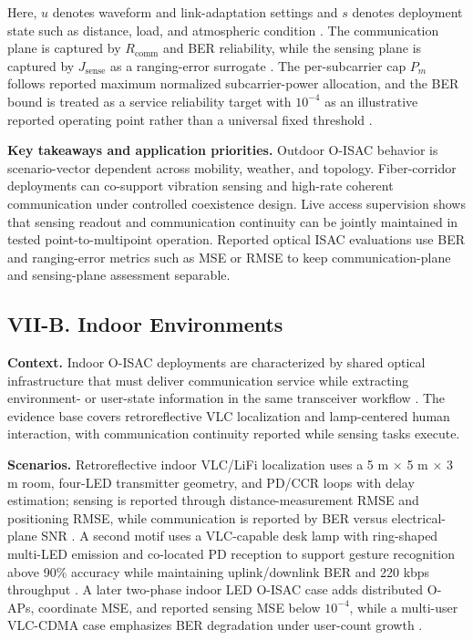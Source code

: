 Here, $u$ denotes waveform and link-adaptation settings and $s$ denotes deployment state such as distance, load, and atmospheric condition \cite{O_ISAC_034,O_ISAC_048}. The communication plane is captured by $R_{\mathrm{comm}}$ and BER reliability, while the sensing plane is captured by $J_{\mathrm{sense}}$ as a ranging-error surrogate \cite{O_ISAC_034,O_ISAC_048}. The per-subcarrier cap $P_m$ follows reported maximum normalized subcarrier-power allocation, and the BER bound is treated as a service reliability target with $10^{-4}$ as an illustrative reported operating point rather than a universal fixed threshold \cite{O_ISAC_034,O_ISAC_048}.

\textbf{Key takeaways and application priorities.} Outdoor O-ISAC behavior is scenario-vector dependent across mobility, weather, and topology. Fiber-corridor deployments can co-support vibration sensing and high-rate coherent communication under controlled coexistence design. Live access supervision shows that sensing readout and communication continuity can be jointly maintained in tested point-to-multipoint operation. Reported optical ISAC evaluations use BER and ranging-error metrics such as MSE or RMSE to keep communication-plane and sensing-plane assessment separable.

\subsection{VII-B. Indoor Environments}

\textbf{Context.} Indoor O-ISAC deployments are characterized by shared optical infrastructure that must deliver communication service while extracting environment- or user-state information in the same transceiver workflow \cite{O_ISAC_011,O_ISAC_030}. The evidence base covers retroreflective VLC localization and lamp-centered human interaction, with communication continuity reported while sensing tasks execute.

\textbf{Scenarios.} Retroreflective indoor VLC/LiFi localization uses a 5 m $\times$ 5 m $\times$ 3 m room, four-LED transmitter geometry, and PD/CCR loops with delay estimation; sensing is reported through distance-measurement RMSE and positioning RMSE, while communication is reported by BER versus electrical-plane SNR \cite{O_ISAC_011}. A second motif uses a VLC-capable desk lamp with ring-shaped multi-LED emission and co-located PD reception to support gesture recognition above 90\% accuracy while maintaining uplink/downlink BER and 220 kbps throughput \cite{O_ISAC_030}. A later two-phase indoor LED O-ISAC case adds distributed O-APs, coordinate MSE, and reported sensing MSE below $10^{-4}$, while a multi-user VLC-CDMA case emphasizes BER degradation under user-count growth \cite{O_ISAC_108,O_ISAC_388}.

